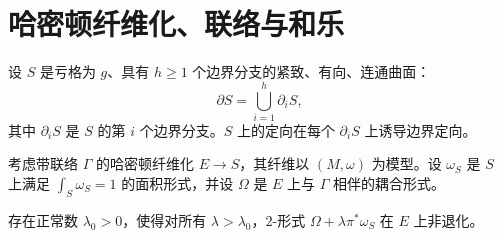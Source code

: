 \section{哈密顿纤维化、联络与和乐}
\label{sec:hamiltonian-fibrations-connections-holonomies}

设 $S$ 是亏格为 $g$、具有 $h\geq1$ 个边界分支的紧致、有向、连通曲面：
\[
 \partial S=\bigcup_{i=1}^h\partial_iS,
\]
其中 $\partial_iS$ 是 $S$ 的第 $i$ 个边界分支。$S$ 上的定向在每个
$\partial_iS$ 上诱导边界定向。

考虑带联络 $\Gamma$ 的哈密顿纤维化 $E\to S$，其纤维以
$(M,\omega)$ 为模型。设 $\omega_S$ 是 $S$ 上满足
$\int_S\omega_S=1$ 的面积形式，并设 $\Omega$ 是 $E$ 上与
$\Gamma$ 相伴的耦合形式。

\begin{proposition}\label{prop:weak-coupling-nondegenerate}
存在正常数 $\lambda_0>0$，使得对所有 $\lambda>\lambda_0$，$2$-形式
$\Omega+\lambda\pi^*\omega_S$ 在 $E$ 上非退化。
\end{proposition}

